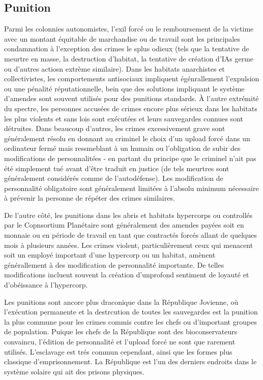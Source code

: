                \subsection{Punition} \label{sec:punishment} 

               Parmi les colonnies autonomistes, l'exil forcé ou le remboursement de la victime avec un montant équitable de marchandise ou de travail sont les principales condamnation à l'exception des crimes le splus odieux (tels que la  tentative de meurtre en masse, la destruction d'habitat, la tentative de création d'IAs germe ou d'autres actiosn extrème similaire). Dans les habitats anarchistes et collectivistes, les comportements antisociaux impliquent égénrallement l'expulsion ou une pénalité réputationnelle, bein que des solutions impliquant le système d'amendes sont souvent utilisés pour des punitions standards. À l'autre extrémité du spectre, les personnes accusées de crimes encore plus sérieux dans les habitats les plus violents et sans lois sont exécutées et leurs sauvegardes connues sont détruites. Dans beaucoup d'autres, les crimes excessivement grave sont généralement résolu en donnant au criminel le choix d'un upload forcé dans un ordinateur fermé mais ressmeblant à un humain ou l'obligation de subir des modifications de personnalitées - en partant du principe que le criminel n'ait pas été simplement tué avant d'être traduit en justice (de tels meurtres sont généralement considérés comme de l'autodéfense). Les modification de personnalité obligatoire sont généralement limitées à l'absolu minimum nécessaire à prévenir la personne de répéter des crimes similaires. 

               De l'autre côté, les punitions dans les abris et habitats hypercorps ou controllés par le Copnsortium Planétaire sont généralement des amendes payées soit en monnaie ou en période de travail en tant que contractés forcés allant de quelques mois à plusieurs années. Les crimes violent, particulièrement ceux qui menacent soit un employé important d'une hypercorp ou un habitat, amènent générallement à des modification de personnalité importante. De telles modifications incluent souvent la création d'unprofond sentiment de loyauté et d'obéissance à l'hypercorp. 

               Les punitions sont ancore plus draconique dans la République Jovienne, où l'exécution permanente et la destrcution de toutes les sauvegardes est la punition la plus commune pour les crimes commis contre les chefs ou d'important groupes de population. Puique les chefs de la République sont des bioconservateurs convaincu, l'édition de personnalité et l'upload forcé ne sont que rarement utilisés. L'esclavage est trés commun cependant, ainsi que les formes plus classique d'emprisonnement. La République est l'un des derniers endroits dans le système solaire qui ait des prisons physiques. 

